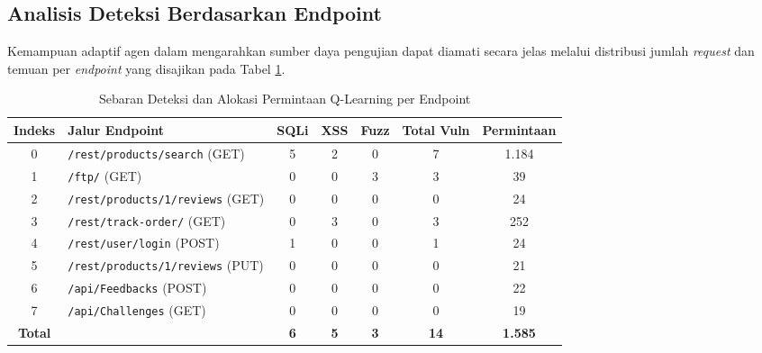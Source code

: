 \subsection{Analisis Deteksi Berdasarkan Endpoint}

Kemampuan adaptif agen dalam mengarahkan sumber daya pengujian dapat diamati secara jelas melalui distribusi jumlah \textit{request} dan temuan per \textit{endpoint} yang disajikan pada Tabel \ref{tab:ql_per_endpoint}.

\begin{table}[htbp]
\centering
\caption{Sebaran Deteksi dan Alokasi Permintaan Q-Learning per Endpoint}
\label{tab:ql_per_endpoint}
\footnotesize %
\setlength{\tabcolsep}{4pt} %
\begin{tabular}{c p{5.5cm} c c c c c}
\toprule
\textbf{Indeks} & \textbf{Jalur Endpoint} & \textbf{SQLi} & \textbf{XSS} & \textbf{Fuzz} & \textbf{Total Vuln} & \textbf{Permintaan} \\
\midrule
0 & \texttt{/rest/products/search} (GET) & 5 & 2 & 0 & 7 & 1.184 \\
1 & \texttt{/ftp/} (GET) & 0 & 0 & 3 & 3 & 39 \\
2 & \texttt{/rest/products/1/reviews} (GET) & 0 & 0 & 0 & 0 & 24 \\
3 & \texttt{/rest/track-order/} (GET) & 0 & 3 & 0 & 3 & 252 \\
4 & \texttt{/rest/user/login} (POST) & 1 & 0 & 0 & 1 & 24 \\
5 & \texttt{/rest/products/1/reviews} (PUT) & 0 & 0 & 0 & 0 & 21 \\
6 & \texttt{/api/Feedbacks} (POST) & 0 & 0 & 0 & 0 & 22 \\
7 & \texttt{/api/Challenges} (GET) & 0 & 0 & 0 & 0 & 19 \\
\midrule
\textbf{Total} & & \textbf{6} & \textbf{5} & \textbf{3} & \textbf{14} & \textbf{1.585} \\
\bottomrule
\end{tabular}
\end{table}

